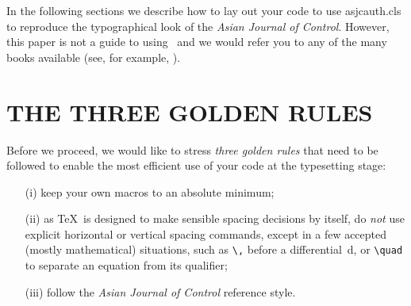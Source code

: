 \documentclass[times]{asjcauth}
\begin{document}
In the following sections we describe how to lay out your code to
use \textsf{asjcauth.cls} to reproduce the typographical look of
the \emph{Asian Journal of Control}. However, this paper is not a
guide to using \LaTeXe\ and we would refer you to any of the many
books available (see, for example, \cite{R1,R2,R3}).

\section{THE THREE GOLDEN RULES} Before we proceed, we would like to
stress \emph{three golden rules} that need to be followed to
enable the most efficient use of your code at the typesetting
stage:
\begin{enumerate}
\item[(i)] keep your own macros to an absolute minimum;

\item[(ii)] as \TeX\ is designed to make sensible spacing
decisions by itself, do \emph{not} use explicit horizontal or
vertical spacing commands, except in a few accepted (mostly
mathematical) situations, such as \verb"\," before a
differential~d, or \verb"\quad" to separate an equation from its
qualifier;

\item[(iii)] follow the \emph{Asian Journal of Control}
reference style.
\end{enumerate}
\end{document}
